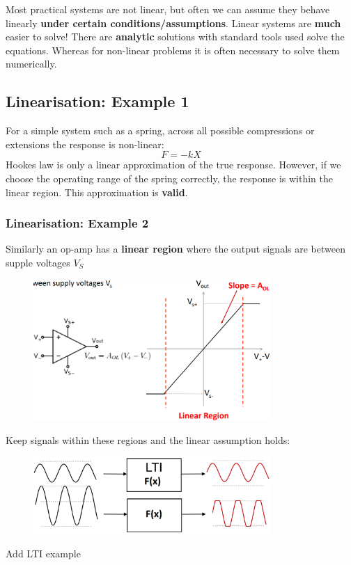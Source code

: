 \documentclass[class=report, crop=false, 12pt,a4paper, tikz, border=4mm]{standalone}
\begin{document}
Most practical systems are not linear, but often we can assume they behave linearly \textbf{under certain conditions/assumptions}. Linear systems are \textbf{much} easier to solve! There are \textbf{analytic} solutions with standard tools used solve the equations. Whereas for non-linear problems it is often necessary to solve them numerically. 
\subsection{Linearisation: Example 1}
For a simple system such as a spring, across all possible compressions or extensions the response is non-linear:
\begin{equation}
  F = -kX
\end{equation}
Hookes law is only a linear approximation of the true response. However, if we choose the operating range of the spring correctly, the response is within the linear region. This approximation is \textbf{valid}.
\subsubsection{Linearisation: Example 2}
Similarly an op-amp has a \textbf{linear region} where the output signals are between supple voltages $V_S$
\begin{figure}[H]
  \centering
  \includegraphics[width = 0.8\textwidth]{../img/graphs4.png}
\end{figure}
Keep signals within these regions and the linear assumption holds:
\begin{figure}[H]
  \centering
  \includegraphics[width = 0.8\textwidth]{../img/blockdiagram9.png}
\end{figure}
Add LTI example
\end{document}
